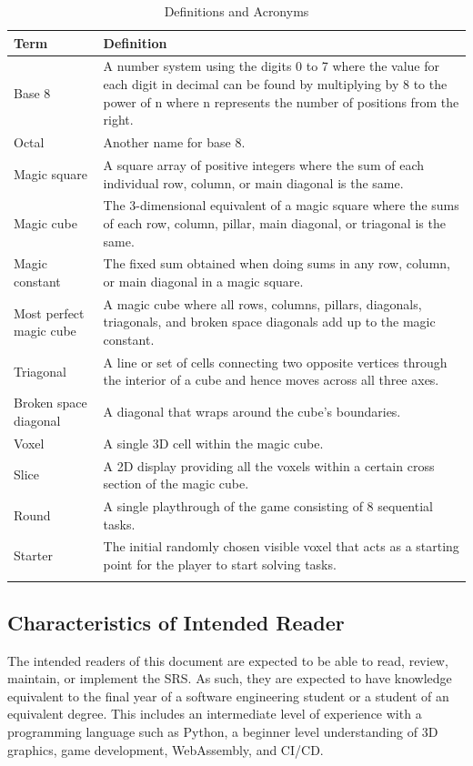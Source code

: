 \documentclass[12pt]{article}
\begin{document}
\begin{longtable}{p{} p{}}
\toprule
Term & Definition\\
\midrule
Base 8 & A number system using the digits 0 to 7 where the value for each digit in decimal can be found by multiplying by 8 to the power of n where n represents the number of positions from the right. \\
Octal & Another name for base 8. \\
Magic square & A square array of positive integers where the sum of each individual row, column, or main diagonal is the same.\\
Magic cube & The 3-dimensional equivalent of a magic square where the sums of each row, column, pillar, main diagonal, or triagonal is the same. \\
Magic constant & The fixed sum obtained when doing sums in any row, column, or main diagonal in a magic square. \\
Most perfect magic cube & A magic cube where all rows, columns, pillars, diagonals, triagonals, and broken space diagonals add up to the magic constant. \\
Triagonal & A line or set of cells connecting two opposite vertices through the interior of a cube and hence moves across all three axes. \\
Broken space diagonal & A diagonal that wraps around the cube's boundaries.\\
Voxel & A single 3D cell within the magic cube. \\
Slice & A 2D display providing all the voxels within a certain cross section of the magic cube.\\
Round & A single playthrough of the game consisting of 8 sequential tasks. \\
Starter & The initial randomly chosen visible voxel that acts as a starting point for the player to start solving tasks.\\
\bottomrule
\caption{Definitions and Acronyms} \label{tab:DefinitionsAndAcronyms}
\end{longtable}

\subsection{Characteristics of Intended Reader} \label{sec_IntendedReader}

The intended readers of this document are expected to be able to read, review, maintain, or implement the SRS. 
As such, they are expected to have knowledge equivalent to the final year of a software engineering student or a student of an equivalent degree.
This includes an intermediate level of experience with a programming language such as Python, a beginner level understanding of 3D graphics, game development, WebAssembly, and CI/CD.
\end{document}

